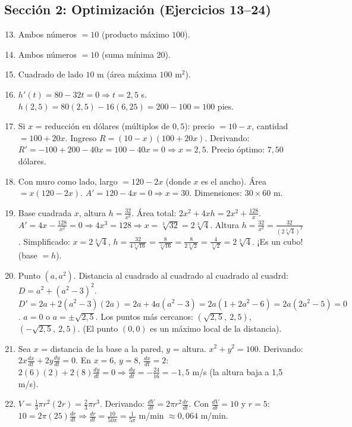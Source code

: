 \documentclass[12pt, a4paper]{article}
\begin{document}
\subsection*{Sección 2: Optimización (Ejercicios 13--24)}

\begin{enumerate}[leftmargin=*, label=\textbf{\arabic*.}]
  \setcounter{enumi}{12}
  \item Ambos números $= 10$ (producto máximo $100$).
  \item Ambos números $= 10$ (suma mínima $20$).
  \item Cuadrado de lado $10$ m (área máxima $100$ m$^2$).
  \item $h'(t) = 80 - 32t = 0 \Rightarrow t = 2{,}5$ s. $h(2{,}5) = 80(2{,}5) - 16(6{,}25) = 200 - 100 = 100$ pies.
  \item Si $x$ = reducción en dólares (múltiplos de $0{,}5$): precio $= 10 - x$, cantidad $= 100 + 20x$. Ingreso $R = (10 - x)(100 + 20x)$. Derivando: $R' = -100 + 200 - 40x = 100 - 40x = 0 \Rightarrow x = 2{,}5$. Precio óptimo: $7{,}50$ dólares.
  \item Con muro como lado, largo $= 120 - 2x$ (donde $x$ es el ancho). Área $= x(120 - 2x)$. $A' = 120 - 4x = 0 \Rightarrow x = 30$. Dimensiones: $30 \times 60$ m.
  \item Base cuadrada $x$, altura $h = \frac{32}{x^2}$. Área total: $2x^2 + 4xh = 2x^2 + \frac{128}{x}$. $A' = 4x - \frac{128}{x^2} = 0 \Rightarrow 4x^3 = 128 \Rightarrow x = \sqrt[3]{32} = 2\sqrt[3]{4}$. Altura $h = \frac{32}{x^2} = \frac{32}{(2\sqrt[3]{4})^2}$. Simplificado: $x = 2\sqrt[3]{4}$, $h = \frac{32}{4 \sqrt[3]{16}} = \frac{8}{\sqrt[3]{16}} = \frac{8}{2\sqrt[3]{2}} = \frac{4}{\sqrt[3]{2}} = 2\sqrt[3]{4}$. ¡Es un cubo! (base $= h$).
  \item Punto $(a, a^2)$. Distancia al cuadrado al cuadrado al cuadrado al cuadrd: $D = a^2 + (a^2 - 3)^2$. $D' = 2a + 2(a^2 - 3)(2a) = 2a + 4a(a^2 - 3) = 2a(1 + 2a^2 - 6) = 2a(2a^2 - 5) = 0$. $a = 0$ o $a = \pm\sqrt{2{,}5}$. Los puntos más cercanos: $\left(\sqrt{2{,}5},\ 2{,}5\right)$, $\left(-\sqrt{2{,}5},\ 2{,}5\right)$. (El punto $(0,0)$ es un máximo local de la distancia).
  \item Sea $x$ = distancia de la base a la pared, $y$ = altura. $x^2 + y^2 = 100$. Derivando: $2x\frac{dx}{dt} + 2y\frac{dy}{dt} = 0$. En $x = 6$, $y = 8$, $\frac{dx}{dt} = 2$: $2(6)(2) + 2(8)\frac{dy}{dt} = 0 \Rightarrow \frac{dy}{dt} = -\frac{24}{16} = -1{,}5$ m/s (la altura baja a 1,5 m/s).
  \item $V = \frac{1}{3}\pi r^2(2r) = \frac{2}{3}\pi r^3$. Derivando: $\frac{dV}{dt} = 2\pi r^2 \frac{dr}{dt}$. Con $\frac{dV}{dt} = 10$ y $r = 5$: $10 = 2\pi(25)\frac{dr}{dt} \Rightarrow \frac{dr}{dt} = \frac{10}{50\pi} = \frac{1}{5\pi}$ m/min $\approx 0{,}064$ m/min.

\end{enumerate}
\end{document}
